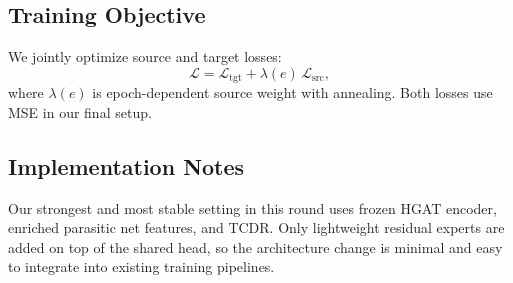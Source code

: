 \subsection{Training Objective}
We jointly optimize source and target losses:
\begin{equation}
\mathcal{L} = \mathcal{L}_{\text{tgt}} + \lambda(e)\,\mathcal{L}_{\text{src}},
\end{equation}
where $\lambda(e)$ is epoch-dependent source weight with annealing.
Both losses use MSE in our final setup.

\subsection{Implementation Notes}
Our strongest and most stable setting in this round uses frozen HGAT encoder, enriched parasitic net features, and TCDR.
Only lightweight residual experts are added on top of the shared head, so the architecture change is minimal and easy to integrate into existing training pipelines.
